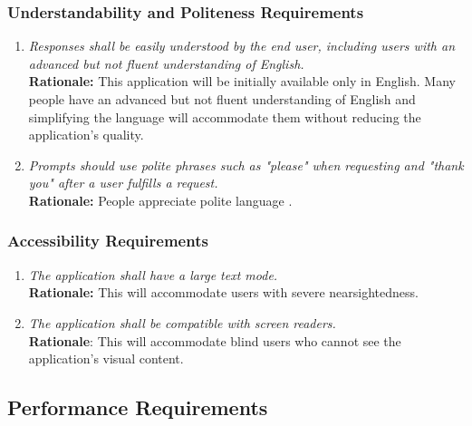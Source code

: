 \documentclass[]{article}
\begin{document}
\subsubsection{Understandability and Politeness Requirements}
\label{ssub:understandability_and_politeness_requirements}
\begin{enumerate}[{UH-UP}1. ]
	\item \textit{Responses shall be easily understood by the end user, including users with an advanced but not fluent understanding of English.} \\ \textbf{Rationale:} This application will be initially available only in English. Many people have an advanced but not fluent understanding of English \cite{USCensus} and simplifying the language will accommodate them without reducing the application's quality.
        \item \textit{Prompts should use polite phrases such as "please" when requesting and "thank you" after a user fulfills a request.} \\ \textbf{Rationale:} People appreciate polite language \cite{Standford}.
\end{enumerate}

\subsubsection{Accessibility Requirements}
\label{ssub:accessibility_requirements}
\begin{enumerate}[{UH-A}1. ]
	\item \textit{The application shall have a large text mode.} \\\textbf{Rationale:} This will accommodate users with severe nearsightedness.
    \item \textit{The application shall be compatible with screen readers.} \\ \textbf{Rationale}: This will accommodate blind users who cannot see the application's visual content.
\end{enumerate}


\subsection{Performance Requirements}
\label{sub:performance_requirements}
\end{document}
